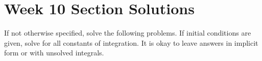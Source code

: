 \documentclass[letterpaper, fontsize=11pt]{scrartcl} %
\numberwithin{equation}{section} %
\numberwithin{figure}{section} %
\numberwithin{table}{section} %
\begin{document}

\newcommand{\horrule}[1]{\rule{\linewidth}{#1}} %


\section*{Week 10 Section Solutions}
\par If not otherwise specified, solve the following problems. If initial conditions are given, solve for all constants of integration. It is okay to leave answers in implicit form or with unsolved integrals. 
\end{document}
